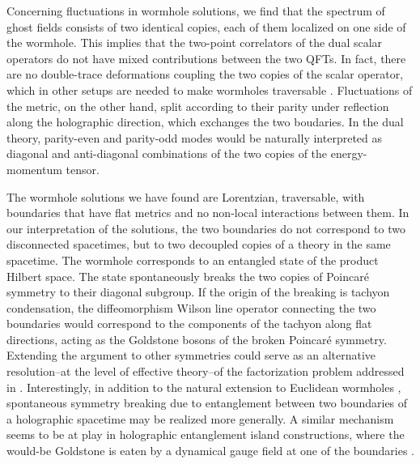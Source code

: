 Concerning fluctuations in wormhole solutions, we find that the spectrum of ghost fields consists of two identical copies, each of them localized on one side of the wormhole. This implies that the two-point correlators of the dual scalar operators do not have mixed contributions between the two QFTs. In fact, there are no double-trace deformations coupling the two copies of the scalar operator, which in other setups are needed to make wormholes traversable \eg \cite{Gao:2016bin,Maldacena:2017axo,Maldacena:2018lmt,Caceres:2018ehr,Bak:2018txn,Ahn:2022suv,Khairunnisa:2025ljk,Djogama:2026pmd}. Fluctuations of the metric, on the other hand, split according to their parity under reflection along the holographic direction, which exchanges the two boudaries. In the dual theory, parity-even and parity-odd modes would be naturally interpreted as diagonal and anti-diagonal combinations of the two copies of the energy-momentum tensor.

The wormhole solutions we have found are Lorentzian, traversable, with boundaries that have flat metrics and no non-local interactions between them. In our interpretation of the solutions, the two boundaries do not correspond to two disconnected spacetimes, but to two decoupled copies of a theory in the same spacetime. The wormhole corresponds to an entangled state of the product Hilbert space. The state spontaneously breaks the two copies of Poincar\'e symmetry to their diagonal subgroup. If the origin of the breaking is tachyon condensation, the diffeomorphism Wilson line operator connecting the two boundaries would correspond to the components of the tachyon along flat directions, acting as the Goldstone bosons of the broken Poincar\'e symmetry. Extending the argument to other symmetries could serve as an alternative resolution--at the level of effective theory--of the factorization problem addressed in \cite{Harlow:2015lma,Guica:2015zpf}. Interestingly, in addition to the natural extension to Euclidean wormholes \cite{Betzios:2023obs}, spontaneous symmetry breaking due to entanglement between two boundaries of a holographic spacetime may be realized more generally. A similar mechanism seems to be at play in holographic entanglement island constructions, where the would-be Goldstone is eaten by a dynamical gauge field at one of the boundaries \cite{Geng:2025byh,Geng:2025gqu,Geng:2025gns,Geng:2025rov}.

